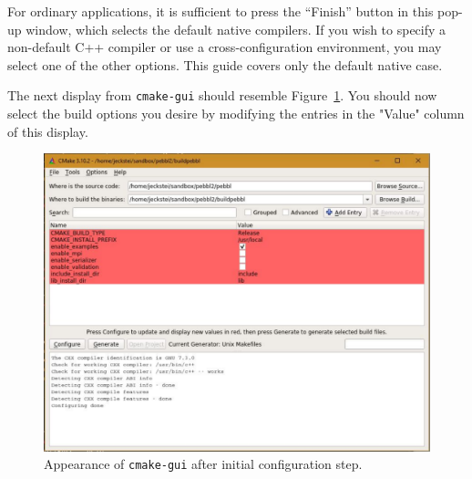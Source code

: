 For ordinary applications, it is sufficient to press the ``Finish'' button in
this pop-up window, which selects the default native compilers.  If you wish
to specify a non-default C++ compiler or use a cross-configuration
environment, you may select one of the other options.  This guide covers only
the default native case.

The next display from \texttt{cmake-gui} should resemble
Figure~\ref{fig:cmake2}.  You should now select the build options you desire
by modifying the entries in the "Value" column of this display.

\begin{figure}[tpb]
\begin{center}
\includegraphics[height=0.45\textheight]{cmake2}
\vspace{-0.3in}
\end{center}{}
\caption{Appearance of \texttt{cmake-gui} after initial configuration step.
  \label{fig:cmake2}}
\end{figure}

